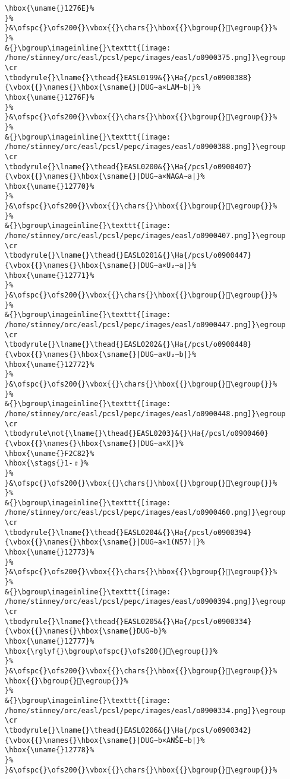 \begin{verbatim}
\hbox{\uname{}1276E}%
}%
}&\ofspc{}\ofs200{}\vbox{{}\chars{}\hbox{{}\bgroup{}𒝮\egroup{}}%
}%
&{}\bgroup\imageinline{}\texttt{[image: /home/stinney/orc/easl/pcsl/pepc/images/easl/o0900375.png]}\egroup
\cr
\tbodyrule{}\lname{}\thead{}EASL0199&{}\Ha{/pcsl/o0900388}{\vbox{{}\names{}\hbox{\sname{}|DUG∼a×LAM∼b|}%
\hbox{\uname{}1276F}%
}%
}&\ofspc{}\ofs200{}\vbox{{}\chars{}\hbox{{}\bgroup{}𒝯\egroup{}}%
}%
&{}\bgroup\imageinline{}\texttt{[image: /home/stinney/orc/easl/pcsl/pepc/images/easl/o0900388.png]}\egroup
\cr
\tbodyrule{}\lname{}\thead{}EASL0200&{}\Ha{/pcsl/o0900407}{\vbox{{}\names{}\hbox{\sname{}|DUG∼a×NAGA∼a|}%
\hbox{\uname{}12770}%
}%
}&\ofspc{}\ofs200{}\vbox{{}\chars{}\hbox{{}\bgroup{}𒝰\egroup{}}%
}%
&{}\bgroup\imageinline{}\texttt{[image: /home/stinney/orc/easl/pcsl/pepc/images/easl/o0900407.png]}\egroup
\cr
\tbodyrule{}\lname{}\thead{}EASL0201&{}\Ha{/pcsl/o0900447}{\vbox{{}\names{}\hbox{\sname{}|DUG∼a×U₂∼a|}%
\hbox{\uname{}12771}%
}%
}&\ofspc{}\ofs200{}\vbox{{}\chars{}\hbox{{}\bgroup{}𒝱\egroup{}}%
}%
&{}\bgroup\imageinline{}\texttt{[image: /home/stinney/orc/easl/pcsl/pepc/images/easl/o0900447.png]}\egroup
\cr
\tbodyrule{}\lname{}\thead{}EASL0202&{}\Ha{/pcsl/o0900448}{\vbox{{}\names{}\hbox{\sname{}|DUG∼a×U₂∼b|}%
\hbox{\uname{}12772}%
}%
}&\ofspc{}\ofs200{}\vbox{{}\chars{}\hbox{{}\bgroup{}𒝲\egroup{}}%
}%
&{}\bgroup\imageinline{}\texttt{[image: /home/stinney/orc/easl/pcsl/pepc/images/easl/o0900448.png]}\egroup
\cr
\tbodyrule\not{\lname{}\thead{}EASL0203}&{}\Ha{/pcsl/o0900460}{\vbox{{}\names{}\hbox{\sname{}|DUG∼a×X|}%
\hbox{\uname{}F2C82}%
\hbox{\stags{}1-﹟}%
}%
}&\ofspc{}\ofs200{}\vbox{{}\chars{}\hbox{{}\bgroup{}󲲂\egroup{}}%
}%
&{}\bgroup\imageinline{}\texttt{[image: /home/stinney/orc/easl/pcsl/pepc/images/easl/o0900460.png]}\egroup
\cr
\tbodyrule{}\lname{}\thead{}EASL0204&{}\Ha{/pcsl/o0900394}{\vbox{{}\names{}\hbox{\sname{}|DUG∼a×1(N57)|}%
\hbox{\uname{}12773}%
}%
}&\ofspc{}\ofs200{}\vbox{{}\chars{}\hbox{{}\bgroup{}𒝳\egroup{}}%
}%
&{}\bgroup\imageinline{}\texttt{[image: /home/stinney/orc/easl/pcsl/pepc/images/easl/o0900394.png]}\egroup
\cr
\tbodyrule{}\lname{}\thead{}EASL0205&{}\Ha{/pcsl/o0900334}{\vbox{{}\names{}\hbox{\sname{}DUG∼b}%
\hbox{\uname{}12777}%
\hbox{\rglyf{}\bgroup\ofspc{}\ofs200{}𒝷\egroup{}}%
}%
}&\ofspc{}\ofs200{}\vbox{{}\chars{}\hbox{{}\bgroup{}𒞭\egroup{}}%
\hbox{{}\bgroup{}𒝷\egroup{}}%
}%
&{}\bgroup\imageinline{}\texttt{[image: /home/stinney/orc/easl/pcsl/pepc/images/easl/o0900334.png]}\egroup
\cr
\tbodyrule{}\lname{}\thead{}EASL0206&{}\Ha{/pcsl/o0900342}{\vbox{{}\names{}\hbox{\sname{}|DUG∼b×ANŠE∼b|}%
\hbox{\uname{}12778}%
}%
}&\ofspc{}\ofs200{}\vbox{{}\chars{}\hbox{{}\bgroup{}𒝸\egroup{}}%

\end{verbatim}
